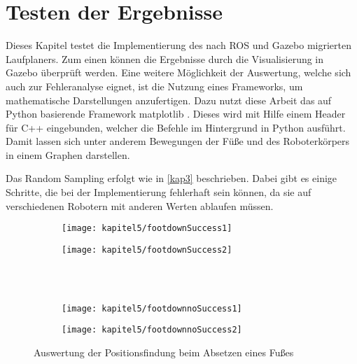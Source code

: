 \chapter{Testen der Ergebnisse}
\label{kap6}

Dieses Kapitel testet die Implementierung des nach \ac{ROS} und Gazebo migrierten Laufplaners. Zum einen können die Ergebnisse durch die Visualisierung in Gazebo überprüft werden. Eine weitere Möglichkeit der Auswertung, welche sich auch zur Fehleranalyse eignet, ist die Nutzung eines Frameworks, um mathematische Darstellungen anzufertigen. Dazu nutzt diese Arbeit das auf Python basierende Framework matplotlib \autocite{barrett2005matplotlib}. Dieses wird mit Hilfe einem Header für C++ eingebunden, welcher die Befehle im Hintergrund in Python ausführt. Damit lassen sich unter anderem Bewegungen der Füße und des Roboterkörpers in einem Graphen darstellen.

Das Random Sampling erfolgt wie in \autoref{kap3} beschrieben. Dabei gibt es einige Schritte, die bei der Implementierung fehlerhaft sein können, da sie auf verschiedenen Robotern mit anderen Werten ablaufen müssen. 

\begin{figure}[t!]
  \centering
  \begin{subfigure}[b]{.5\linewidth}
    \centering
    \texttt{[image: kapitel5/footdownSuccess1]}
    \label{kap5:footDownNormal1}
  \end{subfigure}%
  \begin{subfigure}[b]{.5\linewidth}
    \centering
    \texttt{[image: kapitel5/footdownSuccess2]}
    \label{kap5:footDownNormal2}
  \end{subfigure}\\
  \\[\smallskipamount]
  \begin{subfigure}[b]{.5\linewidth}
    \centering
    \texttt{[image: kapitel5/footdownnoSuccess1]}
    \label{kap5:footDownSpiral1}
  \end{subfigure}%
  \begin{subfigure}[b]{.5\linewidth}
    \centering
    \texttt{[image: kapitel5/footdownnoSuccess2]}
    \label{kap5:footDownSpiral2}
  \end{subfigure}%
  \caption{Auswertung der Positionsfindung beim Absetzen eines Fußes}
  \label{kap5:footDown}
\end{figure}

